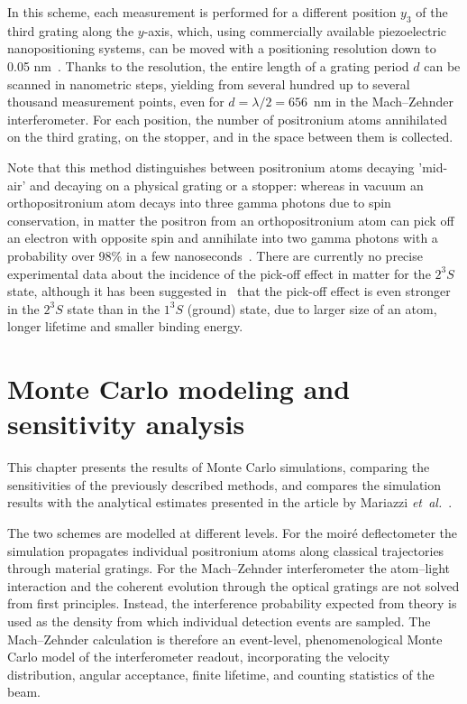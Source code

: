 \documentclass[12pt]{report}
\begin{document}
In this scheme, each measurement is performed for a different position \(y_3\) of the third grating along the \(y\)-axis, which, using commercially available piezoelectric nanopositioning systems, can be moved with a positioning resolution down to 0.05 nm~\cite{PI_P753_3CD}. Thanks to the resolution, the entire length of a grating period \(d\) can be scanned in nanometric steps, yielding from several hundred up to several thousand measurement points, even for \(d=\lambda/2=656\)~nm in the Mach--Zehnder interferometer. For each position, the number of positronium atoms annihilated on the third grating, on the stopper, and in the space between them is collected.


Note that this method distinguishes between positronium atoms decaying 'mid-air' and decaying on a physical grating or a stopper: whereas in vacuum an orthopositronium atom decays into three gamma photons due to spin conservation, in matter the positron from an orthopositronium atom can pick off an electron with opposite spin and annihilate into two gamma photons with a probability over 98\% in a few nanoseconds~\cite{Moskal2020}.
There are currently no precise experimental data about the incidence of the pick-off effect in matter for the \(2^3S\) state, although it has been suggested in~\cite{Cooke2015} that the pick-off effect is even stronger in the \(2^3S\) state than in the \(1^3S\) (ground) state, due to larger size of an atom, longer lifetime and smaller binding energy.


\chapter{Monte Carlo modeling and sensitivity analysis}

This chapter presents the results of Monte Carlo simulations, comparing the sensitivities of the previously described methods, and compares the simulation results with the analytical estimates presented in the article by Mariazzi \emph{et~al.}~\cite{Mariazzi_Caravita_Doser_Nebbia_Brusa_2020}. 

The two schemes are modelled at different levels. For the moir\'e deflectometer the simulation propagates individual positronium atoms along classical trajectories through material gratings. For the Mach--Zehnder interferometer the atom--light interaction and the coherent evolution through the optical gratings are not solved from first principles. Instead, the interference probability expected from theory is used as the density from which individual detection events are sampled. The Mach--Zehnder calculation is therefore an event-level, phenomenological Monte Carlo model of the interferometer readout, incorporating the velocity distribution, angular acceptance, finite lifetime, and counting statistics of the beam.
\end{document}

